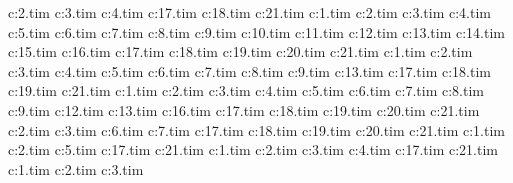 c:\wipeout\textures\drktun2.tim
c:\wipeout\textures\drktun3.tim
c:\wipeout\textures\drktun4.tim
c:\wipeout\textures\drktun17.tim
c:\wipeout\textures\drktun18.tim
c:\wipeout\textures\drktun21.tim
c:\wipeout\textures\drkruf1.tim
c:\wipeout\textures\drkruf2.tim
c:\wipeout\textures\drkruf3.tim
c:\wipeout\textures\drkruf4.tim
c:\wipeout\textures\drkruf5.tim
c:\wipeout\textures\drkruf6.tim
c:\wipeout\textures\drkruf7.tim
c:\wipeout\textures\drkruf8.tim
c:\wipeout\textures\drkruf9.tim
c:\wipeout\textures\drkruf10.tim
c:\wipeout\textures\drkruf11.tim
c:\wipeout\textures\drkruf12.tim
c:\wipeout\textures\drkruf13.tim
c:\wipeout\textures\drkruf14.tim
c:\wipeout\textures\drkruf15.tim
c:\wipeout\textures\drkruf16.tim
c:\wipeout\textures\drkruf17.tim
c:\wipeout\textures\drkruf18.tim
c:\wipeout\textures\drkruf19.tim
c:\wipeout\textures\drkruf20.tim
c:\wipeout\textures\drkruf21.tim
c:\wipeout\textures\fintrk1.tim
c:\wipeout\textures\fintrk2.tim
c:\wipeout\textures\fintrk3.tim
c:\wipeout\textures\fintrk4.tim
c:\wipeout\textures\fintrk5.tim
c:\wipeout\textures\fintrk6.tim
c:\wipeout\textures\fintrk7.tim
c:\wipeout\textures\fintrk8.tim
c:\wipeout\textures\fintrk9.tim
c:\wipeout\textures\fintrk13.tim
c:\wipeout\textures\fintrk17.tim
c:\wipeout\textures\fintrk18.tim
c:\wipeout\textures\fintrk19.tim
c:\wipeout\textures\fintrk21.tim
c:\wipeout\textures\finwal1.tim
c:\wipeout\textures\finwal2.tim
c:\wipeout\textures\finwal3.tim
c:\wipeout\textures\finwal4.tim
c:\wipeout\textures\finwal5.tim
c:\wipeout\textures\finwal6.tim
c:\wipeout\textures\finwal7.tim
c:\wipeout\textures\finwal8.tim
c:\wipeout\textures\finwal9.tim
c:\wipeout\textures\finwal12.tim
c:\wipeout\textures\finwal13.tim
c:\wipeout\textures\finwal16.tim
c:\wipeout\textures\finwal17.tim
c:\wipeout\textures\finwal18.tim
c:\wipeout\textures\finwal19.tim
c:\wipeout\textures\finwal20.tim
c:\wipeout\textures\finwal21.tim
c:\wipeout\textures\nwchev2.tim
c:\wipeout\textures\nwchev3.tim
c:\wipeout\textures\nwchev6.tim
c:\wipeout\textures\nwchev7.tim
c:\wipeout\textures\nwchev17.tim
c:\wipeout\textures\nwchev18.tim
c:\wipeout\textures\nwchev19.tim
c:\wipeout\textures\nwchev20.tim
c:\wipeout\textures\nwchev21.tim
c:\wipeout\textures\brntrk1.tim
c:\wipeout\textures\pointr2.tim
c:\wipeout\textures\brntrk5.tim
c:\wipeout\textures\pointr17.tim
c:\wipeout\textures\pointr21.tim
c:\wipeout\textures\stgrid1.tim
c:\wipeout\textures\stgrid2.tim
c:\wipeout\textures\stgrid3.tim
c:\wipeout\textures\stgrid4.tim
c:\wipeout\textures\stgrid17.tim
c:\wipeout\textures\stgrid21.tim
c:\wipeout\textures\tunruf1.tim
c:\wipeout\textures\tunruf2.tim
c:\wipeout\textures\tunruf3.tim
